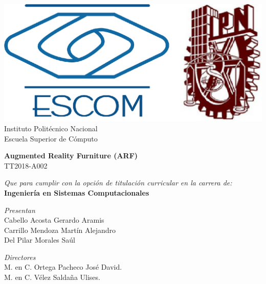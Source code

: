 
\begin{titlepage}

    \centering %

    \includegraphics[scale=0.17]{imagenes/escom-ipn} %
    \LARGE{\\ Instituto Polit\'ecnico Nacional}
    \LARGE{\\ Escuela Superior de C\'omputo}
    
    \vspace{1cm} %

    \LARGE \textbf{Augmented Reality Furniture (ARF)}
    \LARGE {\\ TT2018-A002}

    \vspace{1cm} %

    \LARGE \textit{Que para cumplir con la opción de titulación curricular en la carrera de:}
    \LARGE \textbf{\\ Ingeniería en Sistemas Computacionales}

    \vspace{1cm} %

   \textit{Presentan}\\
    Cabello Acosta Gerardo Aramis\\
    Carrillo Mendoza Martín Alejandro \\
    Del Pilar Morales Saúl

    \vspace{1cm} %

   \textit{Directores}\\
    M. en C. Ortega Pacheco José David. \bigskip  \\
    M. en C. Vélez Saldaña Ulises. \bigskip\\
\end{titlepage}